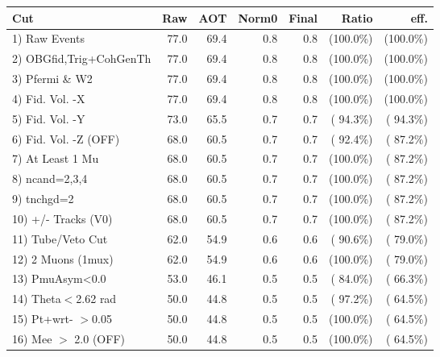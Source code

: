  \begin{table}[h!]\centering
 \begin{tabular}{||l||r|r|r|r|r|r||}
 \hline
 \hline
 Cut & Raw & AOT & Norm0 & Final & Ratio & eff.       \\
 \hline
  1) Raw Events           &         77.0 &         69.4 &          0.8 &          0.8 & (100.0\%) & (100.0\%) \\
  2) OBGfid,Trig+CohGenTh &         77.0 &         69.4 &          0.8 &          0.8 & (100.0\%) & (100.0\%) \\
  3) Pfermi \& W2         &         77.0 &         69.4 &          0.8 &          0.8 & (100.0\%) & (100.0\%) \\
  4) Fid. Vol. -X         &         77.0 &         69.4 &          0.8 &          0.8 & (100.0\%) & (100.0\%) \\
  5) Fid. Vol. -Y         &         73.0 &         65.5 &          0.7 &          0.7 & ( 94.3\%) & ( 94.3\%) \\
  6) Fid. Vol. -Z (OFF)   &         68.0 &         60.5 &          0.7 &          0.7 & ( 92.4\%) & ( 87.2\%) \\
  7) At Least 1 Mu        &         68.0 &         60.5 &          0.7 &          0.7 & (100.0\%) & ( 87.2\%) \\
  8) ncand=2,3,4          &         68.0 &         60.5 &          0.7 &          0.7 & (100.0\%) & ( 87.2\%) \\
  9) tnchgd=2             &         68.0 &         60.5 &          0.7 &          0.7 & (100.0\%) & ( 87.2\%) \\
 10) +/- Tracks (V0)      &         68.0 &         60.5 &          0.7 &          0.7 & (100.0\%) & ( 87.2\%) \\
 11) Tube/Veto Cut        &         62.0 &         54.9 &          0.6 &          0.6 & ( 90.6\%) & ( 79.0\%) \\
 12) 2 Muons (1mux)       &         62.0 &         54.9 &          0.6 &          0.6 & (100.0\%) & ( 79.0\%) \\
 13) PmuAsym<0.0          &         53.0 &         46.1 &          0.5 &          0.5 & ( 84.0\%) & ( 66.3\%) \\
 14) Theta$<$2.62 rad     &         50.0 &         44.8 &          0.5 &          0.5 & ( 97.2\%) & ( 64.5\%) \\
 15) Pt+wrt- $>$0.05      &         50.0 &         44.8 &          0.5 &          0.5 & (100.0\%) & ( 64.5\%) \\
 16) Mee $>$ 2.0  (OFF)   &         50.0 &         44.8 &          0.5 &          0.5 & (100.0\%) & ( 64.5\%) \\

\end{tabular}
\end{table}
